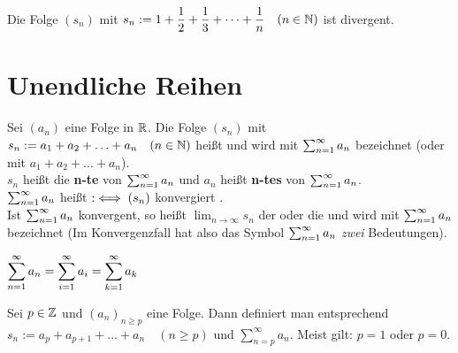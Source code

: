 \documentclass[a4paper,twoside,DIV15,BCOR12mm]{scrbook}
\begin{document}
\begin{folgerung}
Die Folge $(s_n)$ mit $\displaystyle{s_n := 1+\frac{1}{2}+\frac{1}{3}+\cdots+\frac{1}{n}\quad(n\in\ensuremath{\mathbb{N}})}$ ist divergent.
\end{folgerung}

\chapter{Unendliche Reihen}

\begin{definition}
Sei $(a_n)$ eine Folge in $\mathbb{R}$. Die Folge $(s_n)$ mit $s_n := a_1+a_2+\ldots+a_n\quad(n\in\mathbb{N})$ heißt  und wird mit $\sum_{n=1}^{\infty}{a_n}$ bezeichnet (oder mit $a_1+a_2+\ldots+a_n$).\\
$s_n$ heißt die \textbf{n-te } von $\sum_{n=1}^{\infty}{a_n}$ und $a_n$ heißt \textbf{n-tes } von $\sum_{n=1}^{\infty}{a_n}$.\\
$\sum_{n=1}^{\infty}{a_n}$ heißt   $:\iff (s_n)$ konvergiert .\\
Ist $\sum_{n=1}^{\infty}{a_n}$ konvergent, so heißt $\lim_{n\to\infty}{s_n}$ der  oder die  und wird mit $\sum_{n=1}^{\infty}{a_n}$ bezeichnet (Im Konvergenzfall hat also das Symbol $\sum_{n=1}^{\infty}{a_n}$ \emph{zwei} Bedeutungen).
\end{definition}

\begin{bemerkung}
\begin{liste}
\item $\displaystyle{\sum_{n=1}^{\infty}{a_n}= \sum_{i=1}^{\infty}{a_i} = \sum_{k=1}^{\infty}{a_k}}$
\item Sei $p\in\mathbb{Z}$ und $(a_n)_{n \ge p}$ eine Folge. Dann definiert man entsprechend $s_n := a_p+a_{p+1}+\ldots+a_n\quad(n \ge p)$ und $\sum_{n=p}^{\infty}{a_n}$. Meist gilt: $p=1$ oder $p=0$.
\end{liste}
\end{bemerkung}
\end{document}
